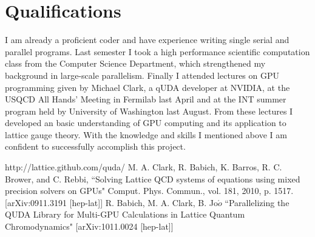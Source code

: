 \documentclass[11pt]{article}
\begin{document}
  \section*{Qualifications} %
  I am already a proficient coder and have experience writing single serial and parallel programs.
  Last semester I took a high performance scientific computation class from the Computer Science Department, which strengthened my background in large-scale parallelism.
  Finally I attended lectures on GPU programming given by Michael Clark, a qUDA developer at NVIDIA, at the USQCD All Hands' Meeting in Fermilab last April and at the INT summer program held by University of Washington last August. 
  From these lectures I developed an basic understanding of GPU computing and its application to lattice gauge theory. 
  With the knowledge and skills I mentioned above I am confident to successfully accomplish this project.

%
\begin{thebibliography}{99}
http://lattice.github.com/quda/
M. A. Clark, R. Babich, K. Barros, R. C. Brower, and C. Rebbi,
``Solving Lattice QCD systems of equations using mixed precision solvers on GPUs" Comput. Phys. Commun., vol. 181, 2010, p. 1517. [arXiv:0911.3191 
[hep-lat]]
R. Babich, M. A. Clark, B. Jo$\acute{o}$ ``Parallelizing the QUDA Library for Multi-GPU Calculations in Lattice Quantum Chromodynamics" [arXiv:1011.0024 
[hep-lat]]

\end{thebibliography}
\end{document}

